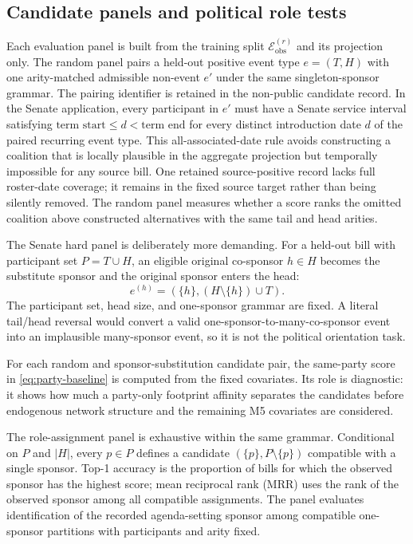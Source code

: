 \documentclass{nws}
\begin{document}
\subsection{Candidate panels and political role tests}\label{sec:panels}

Each evaluation panel is built from the training split $\mathcal{E}^{(r)}_{\mathrm{obs}}$ and its projection only. The random panel pairs a held-out positive event type $e=(T,H)$ with one arity-matched admissible non-event $e'$ under the same singleton-sponsor grammar. The pairing identifier is retained in the non-public candidate record. In the Senate application, every participant in $e'$ must have a Senate service interval satisfying $\text{term start}\leq d<\text{term end}$ for every distinct introduction date $d$ of the paired recurring event type. This all-associated-date rule avoids constructing a coalition that is locally plausible in the aggregate projection but temporally impossible for any source bill. One retained source-positive record lacks full roster-date coverage; it remains in the fixed source target rather than being silently removed. The random panel measures whether a score ranks the omitted coalition above constructed alternatives with the same tail and head arities.



The Senate hard panel is deliberately more demanding. For a held-out bill with participant set $P=T\cup H$, an eligible original co-sponsor $h\in H$ becomes the substitute sponsor and the original sponsor enters the head:
\begin{equation}
 e^{(h)}=(\{h\},(H\setminus\{h\})\cup T).
 \label{eq:sponsor-substitution}
\end{equation}
The participant set, head size, and one-sponsor grammar are fixed. A literal tail/head reversal would convert a valid one-sponsor-to-many-co-sponsor event into an implausible many-sponsor event, so it is not the political orientation task.

For each random and sponsor-substitution candidate pair, the same-party score in \eqref{eq:party-baseline} is computed from the fixed covariates. Its role is diagnostic: it shows how much a party-only footprint affinity separates the candidates before endogenous network structure and the remaining M5 covariates are considered.

The role-assignment panel is exhaustive within the same grammar. Conditional on $P$ and $|H|$, every $p\in P$ defines a candidate $(\{p\},P\setminus\{p\})$ compatible with a single sponsor. Top-1 accuracy is the proportion of bills for which the observed sponsor has the highest score; mean reciprocal rank (MRR) uses the rank of the observed sponsor among all compatible assignments. The panel evaluates identification of the recorded agenda-setting sponsor among compatible one-sponsor partitions with participants and arity fixed.
\end{document}
